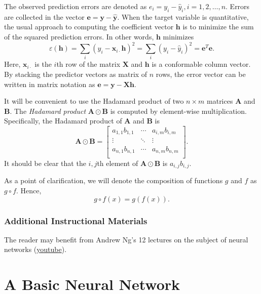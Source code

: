 \documentclass[graybox,envcountchap]{svmono}
\newcommand{\Xf}{\mathbf{X}}
\newcommand{\hf}{\mathbf{h}}
\newcommand{\xf}{\mathbf{x}}
\newcommand{\yf}{\mathbf{y}}
\newcommand{\nn}{neural network}
\newcommand{\w}{\widehat}
\begin{document}
The observed prediction errors are denoted as  $e_i = y_i - \w{y}_i, i=1,2,\ldots,n$. Errors  are collected in the vector $\mathbf{e} = \yf -  \w{\yf}$.  When the target variable is quantitative, the usual approach to computing the coefficient vector $\hf$ is to minimize the sum of the squared prediction errors.  In other words, $\hf$ minimizes 
\begin{equation}\label{eq:sqrErrorLoss}
 \varepsilon(\hf) = \sum_i (y_i - \xf_{i \cdot}\hf)^2 = \sum_i (y_i - \w{y}_i)^2 = \mathbf{e} ^T\mathbf{e} .
\end{equation}
Here, $\xf_{i \cdot}$ is the $i$th row of the matrix $\Xf$ and $\hf$ is a conformable column vector. By stacking the predictor vectors as  matrix of $n$ rows, the error vector can be written in matrix notation as $\mathbf{e} = \yf - \Xf\hf$. 

It will be convenient to use the Hadamard product of two $n \times m$ matrices $\mathbf{A}$ and $\mathbf{B}$. The \emph{Hadamard product} $\mathbf{A} \odot \mathbf{B}$ is computed by element-wise multiplication.  Specifically, the Hadamard product of $\mathbf{A}$ and $\mathbf{B}$ is 
\begin{equation}\label{eq:Hadamard}
 \mathbf{A} \odot \mathbf{B} = 
 \left[\begin{matrix}
 a_{1,1}b_{1,1} & \cdots & a_{i,m}b_{i,m} \\
 \vdots & \ddots & \vdots \\
 a_{n,1}b_{n,1} & \cdots & a_{n,m}b_{n,m} \\
 \end{matrix}\right].
\end{equation}
It should be clear that the $i,j$th element of   $\mathbf{A} \odot \mathbf{B}$ is $a_{i,j}b_{i,j}$. 

As a point of clarification, we will denote the composition of functions $g$ and $f$ as $g \circ f$. Hence, 
\begin{equation*}
 g \circ f(x) = g(f(x)).
\end{equation*}

\subsection{Additional Instructional Materials}

The reader may benefit from Andrew Ng's 12 lectures on the subject of \nn s  (\href{https://www.youtube.com/watch?v=PaMoZnMdffI&list=PLb5_yhcKYi-XBpsKR9GKl6PyvrcNa-Od5}{youtube}).

\chapter{A Basic Neural Network}
\end{document}
